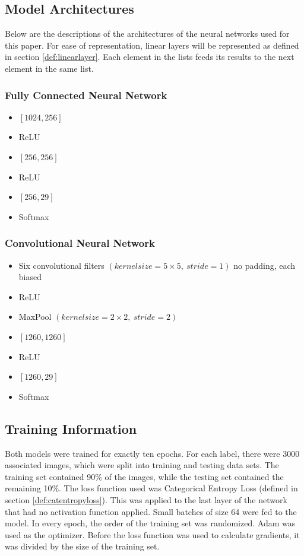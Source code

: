 \documentclass[10pt,Times New Roman]{article}
\begin{document}
    \subsection{Model Architectures}
    Below are the descriptions of the architectures of the neural networks used for this paper.
    For ease of representation, linear layers will be represented as defined in section 
    \ref{def:linearlayer}. Each element in the lists feeds its results to the next element in
    the same list.

        \subsubsection{Fully Connected Neural Network}
        \begin{itemize}[label=$\rightarrow$]
            \item $[1024, 256]$
            \item ReLU
            \item $[256, 256]$
            \item ReLU
            \item $[256, 29]$
            \item Softmax
        \end{itemize}
       
        \subsubsection{Convolutional Neural Network}
        \begin{itemize}[label=$\rightarrow$]
            \item Six convolutional filters $(kernel size=5\times5,\ stride = 1)$ no padding, each biased
            \item ReLU
            \item MaxPool $(kernel size= 2\times2,\ stride = 2)$
            \item $[1260, 1260]$
            \item ReLU
            \item $[1260,29]$
            \item Softmax
        \end{itemize}

    \subsection{Training Information}
        Both models were trained for exactly ten epochs. For each label, there were 3000 
        associated images, which were split into training and testing data sets. The 
        training set contained 90\% of the images, while the testing set contained the
        remaining 10\%. The loss function used was Categorical Entropy Loss (defined in 
        section \ref{def:catentropyloss}). This was applied to the last layer of the network that 
        had no activation function applied. Small batches of size 64 were fed to the model.
        In every epoch, the order of the training set was randomized. Adam was used as the
        optimizer. Before the loss function was used to calculate gradients, it was divided
        by the size of the training set.
\end{document}

